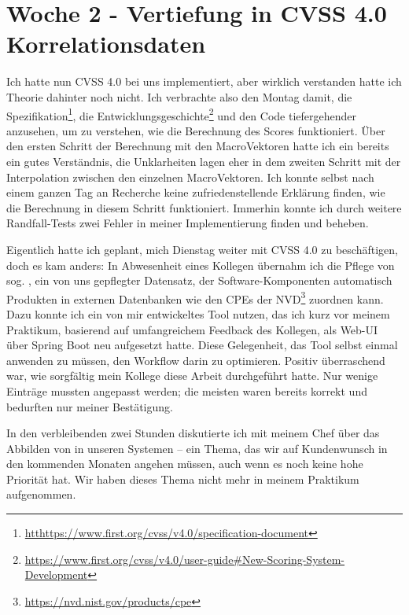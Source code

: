 \section{Woche 2 - Vertiefung in CVSS 4.0 \headerand Korrelationsdaten} \label{sec:bericht-wo-2}


\lweekdaymarginpar{\weekdayMondayLong}

Ich hatte nun CVSS 4.0 bei uns implementiert, aber wirklich verstanden hatte ich Theorie dahinter noch nicht.
Ich verbrachte also den Montag damit, die Spezifikation\footnote{\url{htthttps://www.first.org/cvss/v4.0/specification-document}},
die Entwicklungsgeschichte\footnote{\url{https://www.first.org/cvss/v4.0/user-guide\#New-Scoring-System-Development}}
und den Code tiefergehender anzusehen, um zu verstehen, wie die Berechnung des Scores funktioniert.
Über den ersten Schritt der Berechnung mit den MacroVektoren hatte ich ein bereits ein gutes Verständnis, die Unklarheiten lagen eher in dem zweiten Schritt mit der Interpolation zwischen den einzelnen MacroVektoren.
Ich konnte selbst nach einem ganzen Tag an Recherche keine zufriedenstellende Erklärung finden, wie die Berechnung in diesem Schritt funktioniert.
Immerhin konnte ich durch weitere Randfall-Tests zwei Fehler in meiner Implementierung finden und beheben.

\sweekdaymarginpar{\weekdayTuesdayShort, \weekdayWednesdayShort}

Eigentlich hatte ich geplant, mich Dienstag weiter mit CVSS 4.0 zu beschäftigen, doch es kam anders:
In Abwesenheit eines Kollegen übernahm ich die Pflege von sog. , ein von uns gepflegter Datensatz, der Software-Komponenten automatisch Produkten in externen Datenbanken wie den CPEs der NVD\footnote{\url{https://nvd.nist.gov/products/cpe}} zuordnen kann.
Dazu konnte ich ein von mir entwickeltes Tool nutzen, das ich kurz vor meinem Praktikum, basierend auf umfangreichem Feedback des Kollegen, als Web-UI über Spring Boot neu aufgesetzt hatte.
Diese Gelegenheit, das Tool selbst einmal anwenden zu müssen, den Workflow darin zu optimieren.
Positiv überraschend war, wie sorgfältig mein Kollege diese Arbeit durchgeführt hatte.
Nur wenige Einträge mussten angepasst werden; die meisten waren bereits korrekt und bedurften nur meiner Bestätigung.

In den verbleibenden zwei Stunden diskutierte ich mit meinem Chef über das Abbilden von  in unseren Systemen – ein Thema, das wir auf Kundenwunsch in den kommenden Monaten angehen müssen, auch wenn es noch keine hohe Priorität hat.
Wir haben dieses Thema nicht mehr in meinem Praktikum aufgenommen.

